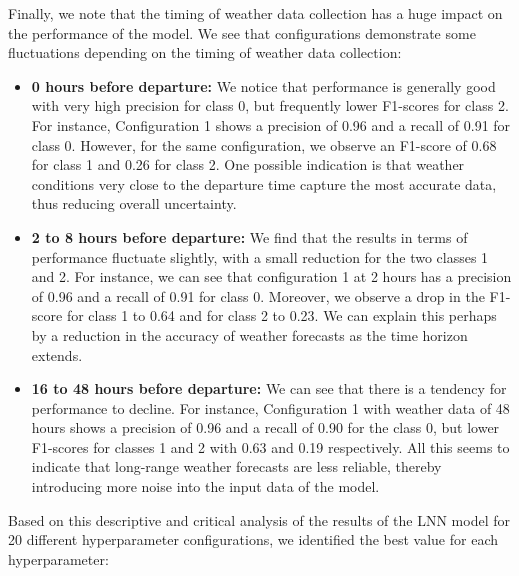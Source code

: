 \documentclass[12pt,oneside]{book} %
\begin{document}
\noindent Finally, we note that the timing of weather data collection has a huge impact on the performance of the model. We see that configurations demonstrate some fluctuations depending on the timing of weather data collection: 
\begin{itemize}
    \item \textbf{0 hours before departure:} We notice that performance is generally good with very high precision for class 0, but frequently lower F1-scores for class 2. For instance, Configuration 1 shows a precision of 0.96 and a recall of 0.91 for class 0. However, for the same configuration, we observe an F1-score of 0.68 for class 1 and 0.26 for class 2. One possible indication is that weather conditions very close to the departure time capture the most accurate data, thus reducing overall uncertainty.
    \item \textbf{2 to 8 hours before departure:} We find that the results in terms of performance fluctuate slightly, with a small reduction for the two classes 1 and 2. For instance, we can see that configuration 1 at 2 hours has a precision of 0.96 and a recall of 0.91 for class 0. Moreover, we observe a drop in the F1-score for class 1 to 0.64 and for class 2 to 0.23. We can explain this perhaps by a reduction in the accuracy of weather forecasts as the time horizon extends.
    \item \textbf{16 to 48 hours before departure:} We can see that there is a tendency for performance to decline. For instance, Configuration 1 with weather data of 48 hours shows a precision of 0.96 and a recall of 0.90 for the class 0, but lower F1-scores for classes 1 and 2 with 0.63 and 0.19 respectively. All this seems to indicate that long-range weather forecasts are less reliable, thereby introducing more noise into the input data of the model.
\end{itemize}

\noindent Based on this descriptive and critical analysis of the results of the LNN model for 20 different hyperparameter configurations, we identified the best value for each hyperparameter: 
\end{document}
